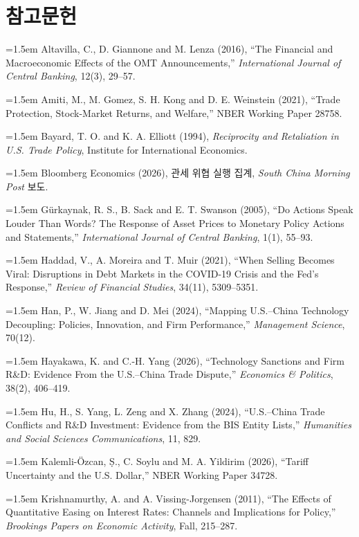 \documentclass[11pt,a4paper]{article}
\begin{document}
\section*{참고문헌}
\begingroup\small\setlength{\parindent}{0pt}\setlength{\parskip}{3pt}\RaggedRight
\newcommand{\bibitemx}{\hangindent=1.5em }
\bibitemx Altavilla, C., D. Giannone and M. Lenza (2016), ``The Financial and Macroeconomic Effects of the OMT Announcements,'' \textit{International Journal of Central Banking}, 12(3), 29--57.\par
\bibitemx Amiti, M., M. Gomez, S. H. Kong and D. E. Weinstein (2021), ``Trade Protection, Stock-Market Returns, and Welfare,'' NBER Working Paper 28758.\par
\bibitemx Bayard, T. O. and K. A. Elliott (1994), \textit{Reciprocity and Retaliation in U.S. Trade Policy}, Institute for International Economics.\par
\bibitemx Bloomberg Economics (2026), 관세 위협 실행 집계, \textit{South China Morning Post} 보도.\par
\bibitemx Gürkaynak, R. S., B. Sack and E. T. Swanson (2005), ``Do Actions Speak Louder Than Words? The Response of Asset Prices to Monetary Policy Actions and Statements,'' \textit{International Journal of Central Banking}, 1(1), 55--93.\par
\bibitemx Haddad, V., A. Moreira and T. Muir (2021), ``When Selling Becomes Viral: Disruptions in Debt Markets in the COVID-19 Crisis and the Fed's Response,'' \textit{Review of Financial Studies}, 34(11), 5309--5351.\par
\bibitemx Han, P., W. Jiang and D. Mei (2024), ``Mapping U.S.--China Technology Decoupling: Policies, Innovation, and Firm Performance,'' \textit{Management Science}, 70(12).\par
\bibitemx Hayakawa, K. and C.-H. Yang (2026), ``Technology Sanctions and Firm R\&D: Evidence From the U.S.--China Trade Dispute,'' \textit{Economics \& Politics}, 38(2), 406--419.\par
\bibitemx Hu, H., S. Yang, L. Zeng and X. Zhang (2024), ``U.S.--China Trade Conflicts and R\&D Investment: Evidence from the BIS Entity Lists,'' \textit{Humanities and Social Sciences Communications}, 11, 829.\par
\bibitemx Kalemli-Özcan, Ṣ., C. Soylu and M. A. Yildirim (2026), ``Tariff Uncertainty and the U.S. Dollar,'' NBER Working Paper 34728.\par
\bibitemx Krishnamurthy, A. and A. Vissing-Jorgensen (2011), ``The Effects of Quantitative Easing on Interest Rates: Channels and Implications for Policy,'' \textit{Brookings Papers on Economic Activity}, Fall, 215--287.\par
\end{document}
